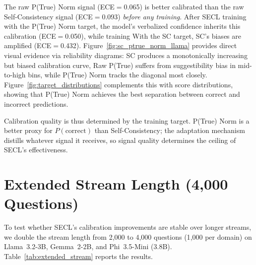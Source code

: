 The raw P(True) Norm signal (ECE$=$0.065) is better calibrated than the
raw Self-Consistency signal (ECE$=$0.093) \emph{before any training}.
After SECL training with the P(True) Norm target, the model's verbalized
confidence inherits this calibration (ECE$=$0.050), while training
With the SC target, SC's biases are amplified (ECE$=$0.432).
Figure~\ref{fig:sc_ptrue_norm_llama} provides direct visual
evidence via reliability diagrams: SC produces a monotonically
increasing but biased calibration curve, Raw P(True) suffers from
suggestibility bias in mid-to-high bins, while P(True) Norm
tracks the diagonal most closely.
Figure~\ref{fig:target_distributions} complements this with
score distributions, showing that P(True) Norm achieves the best
separation between correct and incorrect predictions.

Calibration quality is thus determined by the training target.
P(True) Norm is a better proxy for $P(\text{correct})$ than Self-Consistency; the adaptation mechanism distills whatever signal it receives, so signal quality determines the ceiling of SECL's effectiveness.

\section{Extended Stream Length (4{,}000 Questions)}
\label{app:extended_stream}

To test whether SECL's calibration improvements are stable over longer streams, we double the stream length from 2{,}000 to 4{,}000 questions (1{,}000 per domain) on Llama~3.2-3B, Gemma~2-2B, and Phi~3.5-Mini (3.8B). Table~\ref{tab:extended_stream} reports the results.

